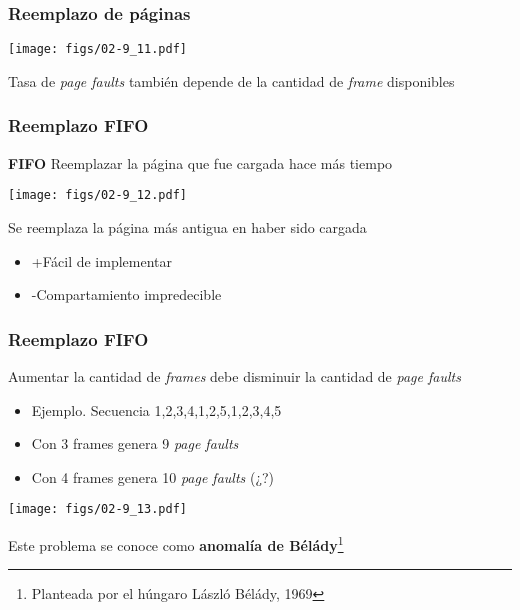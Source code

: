 \documentclass[letter]{beamer}
\begin{document}
\begin{frame}
  \frametitle{Reemplazo de páginas}

  \begin{center}
    \texttt{[image: figs/02-9\_11.pdf]}
  \end{center}
  
  Tasa de {\em page faults} también depende de la cantidad de {\em frame} disponibles
  
\end{frame}

\begin{frame}
  \frametitle{Reemplazo FIFO}

  \begin{block}{{\bf FIFO}}
    Reemplazar la página que fue cargada hace más tiempo
  \end{block}

  \begin{center}
    \texttt{[image: figs/02-9\_12.pdf]}
  \end{center}

  Se reemplaza la página más antigua en haber sido cargada
  \begin{itemize}
    \item +Fácil de implementar
    \item -Compartamiento impredecible
  \end{itemize}
\end{frame}

\begin{frame}
  \frametitle{Reemplazo FIFO}

  Aumentar la cantidad de {\em frames} debe disminuir la cantidad de {\em page faults}
  
  \begin{itemize}
    \item Ejemplo. Secuencia 1,2,3,4,1,2,5,1,2,3,4,5
    \item Con 3 frames genera 9 {\em page faults}
    \item Con 4 frames genera 10 {\em page faults} (¿?)
  \end{itemize}
  
  \begin{center}
    \texttt{[image: figs/02-9\_13.pdf]}
  \end{center}

  Este problema se conoce como {\bf anomalía de Bélády}\footnote{Planteada por el húngaro László Bélády, 1969} 

\end{frame}
\end{document}
